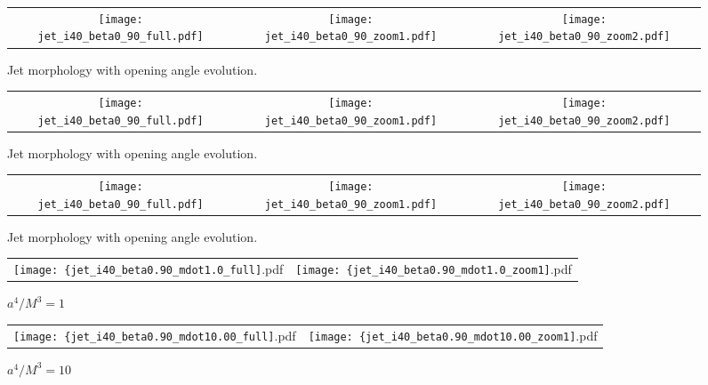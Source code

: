 \documentclass[iop]{emulateapj}
\begin{document}
\begin{figure*}
\begin{center}
  \begin{tabular}{ccc}
    \texttt{[image: jet\_i40\_beta0\_90\_full.pdf]} &
    \texttt{[image: jet\_i40\_beta0\_90\_zoom1.pdf]} &
    \texttt{[image: jet\_i40\_beta0\_90\_zoom2.pdf]}
  \end{tabular}
\end{center}
\caption{Jet morphology with opening angle evolution.}
\label{fig:jet_psi}
\end{figure*}

\begin{figure*}
\begin{center}
  \begin{tabular}{ccc}
    \texttt{[image: jet\_i40\_beta0\_90\_full.pdf]} &
    \texttt{[image: jet\_i40\_beta0\_90\_zoom1.pdf]} &
    \texttt{[image: jet\_i40\_beta0\_90\_zoom2.pdf]}
  \end{tabular}
\end{center}
\caption{Jet morphology with opening angle evolution.}
\label{fig:jet_psi}
\end{figure*}

\begin{figure*}
\begin{center}
  \begin{tabular}{ccc}
    \texttt{[image: jet\_i40\_beta0\_90\_full.pdf]} &
    \texttt{[image: jet\_i40\_beta0\_90\_zoom1.pdf]} &
    \texttt{[image: jet\_i40\_beta0\_90\_zoom2.pdf]}
  \end{tabular}
\end{center}
\caption{Jet morphology with opening angle evolution.}
\label{fig:jet_psi}
\end{figure*}

\begin{figure*}
\begin{center}
  \begin{tabular}{cc}
    \texttt{[image: \{jet\_i40\_beta0.90\_mdot1.0\_full]}.pdf} &
    \texttt{[image: \{jet\_i40\_beta0.90\_mdot1.0\_zoom1]}.pdf} 
  \end{tabular}
\end{center}
\caption{$a^4/M^3=1$}
\label{fig:jet_mdot1.0}
\end{figure*}

\begin{figure*}
\begin{center}
  \begin{tabular}{cc}
    \texttt{[image: \{jet\_i40\_beta0.90\_mdot10.00\_full]}.pdf} &
    \texttt{[image: \{jet\_i40\_beta0.90\_mdot10.00\_zoom1]}.pdf} 
  \end{tabular}
\end{center}
\caption{$a^4/M^3=10$}
\label{fig:jet_10.0}
\end{figure*}
\end{document}
